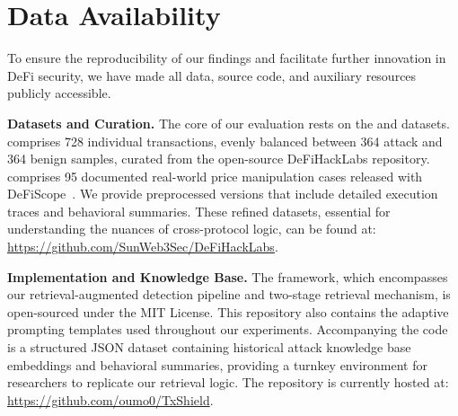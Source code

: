 \section{Data Availability}

To ensure the reproducibility of our findings and facilitate further innovation in DeFi security, we have made all data, source code, and auxiliary resources publicly accessible.

\textbf{Datasets and Curation.} The core of our evaluation rests on the \dsystem{} and \done{} datasets. \dsystem{} comprises 728 individual transactions, evenly balanced between 364 attack and 364 benign samples, curated from the open-source DeFiHackLabs repository. \done{} comprises 95 documented real-world price manipulation cases released with DeFiScope~\cite{zhong2025detectingvariousdefiprice}. We provide preprocessed versions that include detailed execution traces and behavioral summaries. These refined datasets, essential for understanding the nuances of cross-protocol logic, can be found at: \url{https://github.com/SunWeb3Sec/DeFiHackLabs}.


\textbf{Implementation and Knowledge Base.} The \approach{} framework, which encompasses our retrieval-augmented detection pipeline and two-stage retrieval mechanism, is open-sourced under the MIT License. This repository also contains the adaptive prompting templates used throughout our experiments. Accompanying the code is a structured JSON dataset containing historical attack knowledge base embeddings and behavioral summaries, providing a turnkey environment for researchers to replicate our retrieval logic. The repository is currently hosted at:  \url{https://github.com/oumo0/TxShield}.



